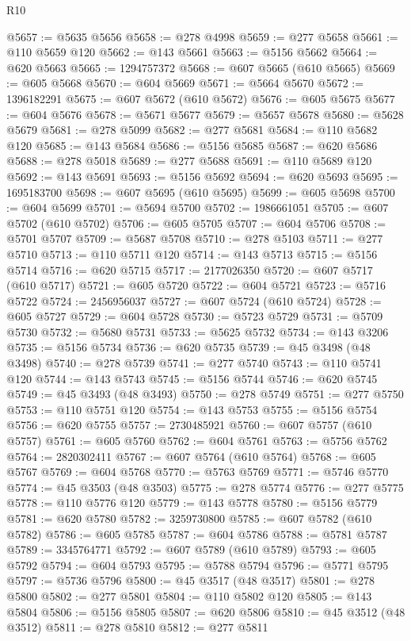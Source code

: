 \begin{lexlean}{R10}
\begin{coremodule}
{{{{{{{{{{{{{{{{{{{{{{{{{{{{{{{{{{{{{{{{{{{{{{{{{{{{{{{{{{{{{{{{{{{{{{{{{{{{{{{{{{{{@5657 := @5635 @5656
@5658 := @278 @4998
@5659 := @277 @5658
@5661 := @110 @5659 @120
@5662 := @143 @5661
@5663 := @5156 @5662
@5664 := @620 @5663
@5665 := 1294757372
@5668 := @607 @5665 (@610 @5665)
@5669 := @605 @5668
@5670 := @604 @5669
@5671 := @5664 @5670
@5672 := 1396182291
@5675 := @607 @5672 (@610 @5672)
@5676 := @605 @5675
@5677 := @604 @5676
@5678 := @5671 @5677
@5679 := @5657 @5678
@5680 := @5628 @5679
@5681 := @278 @5099
@5682 := @277 @5681
@5684 := @110 @5682 @120
@5685 := @143 @5684
@5686 := @5156 @5685
@5687 := @620 @5686
@5688 := @278 @5018
@5689 := @277 @5688
@5691 := @110 @5689 @120
@5692 := @143 @5691
@5693 := @5156 @5692
@5694 := @620 @5693
@5695 := 1695183700
@5698 := @607 @5695 (@610 @5695)
@5699 := @605 @5698
@5700 := @604 @5699
@5701 := @5694 @5700
@5702 := 1986661051
@5705 := @607 @5702 (@610 @5702)
@5706 := @605 @5705
@5707 := @604 @5706
@5708 := @5701 @5707
@5709 := @5687 @5708
@5710 := @278 @5103
@5711 := @277 @5710
@5713 := @110 @5711 @120
@5714 := @143 @5713
@5715 := @5156 @5714
@5716 := @620 @5715
@5717 := 2177026350
@5720 := @607 @5717 (@610 @5717)
@5721 := @605 @5720
@5722 := @604 @5721
@5723 := @5716 @5722
@5724 := 2456956037
@5727 := @607 @5724 (@610 @5724)
@5728 := @605 @5727
@5729 := @604 @5728
@5730 := @5723 @5729
@5731 := @5709 @5730
@5732 := @5680 @5731
@5733 := @5625 @5732
@5734 := @143 @3206
@5735 := @5156 @5734
@5736 := @620 @5735
@5739 := @45 @3498 (@48 @3498)
@5740 := @278 @5739
@5741 := @277 @5740
@5743 := @110 @5741 @120
@5744 := @143 @5743
@5745 := @5156 @5744
@5746 := @620 @5745
@5749 := @45 @3493 (@48 @3493)
@5750 := @278 @5749
@5751 := @277 @5750
@5753 := @110 @5751 @120
@5754 := @143 @5753
@5755 := @5156 @5754
@5756 := @620 @5755
@5757 := 2730485921
@5760 := @607 @5757 (@610 @5757)
@5761 := @605 @5760
@5762 := @604 @5761
@5763 := @5756 @5762
@5764 := 2820302411
@5767 := @607 @5764 (@610 @5764)
@5768 := @605 @5767
@5769 := @604 @5768
@5770 := @5763 @5769
@5771 := @5746 @5770
@5774 := @45 @3503 (@48 @3503)
@5775 := @278 @5774
@5776 := @277 @5775
@5778 := @110 @5776 @120
@5779 := @143 @5778
@5780 := @5156 @5779
@5781 := @620 @5780
@5782 := 3259730800
@5785 := @607 @5782 (@610 @5782)
@5786 := @605 @5785
@5787 := @604 @5786
@5788 := @5781 @5787
@5789 := 3345764771
@5792 := @607 @5789 (@610 @5789)
@5793 := @605 @5792
@5794 := @604 @5793
@5795 := @5788 @5794
@5796 := @5771 @5795
@5797 := @5736 @5796
@5800 := @45 @3517 (@48 @3517)
@5801 := @278 @5800
@5802 := @277 @5801
@5804 := @110 @5802 @120
@5805 := @143 @5804
@5806 := @5156 @5805
@5807 := @620 @5806
@5810 := @45 @3512 (@48 @3512)
@5811 := @278 @5810
@5812 := @277 @5811
}}}}}}}}}}}}}}}}}}}}}}}}}}}}}}}}}}}}}}}}}}}}}}}}}}}}}}}}}}}}}}}}}}}}}}}}}}}}}}}}}}}}
\end{coremodule}
\end{lexlean}
